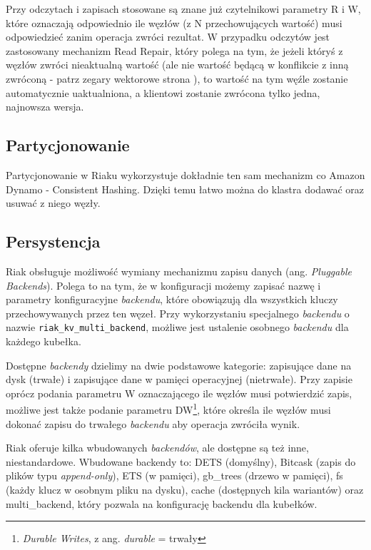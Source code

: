 Przy odczytach i zapisach stosowane są znane już czytelnikowi parametry R i W, które oznaczają odpowiednio ile węzłów (z N przechowujących wartość) musi odpowiedzieć zanim operacja zwróci rezultat.
W przypadku odczytów jest zastosowany mechanizm Read Repair, który polega na tym, że jeżeli któryś z węzłów zwróci nieaktualną wartość (ale nie wartość będącą w konflikcie z inną zwróconą - patrz zegary wektorowe strona \pageref{sec:dynamo-vector-clocks}), to wartość na tym węźle zostanie automatycznie uaktualniona, a klientowi zostanie zwrócona tylko jedna, najnowsza wersja. 

\subsection*{Partycjonowanie}

Partycjonowanie w Riaku wykorzystuje dokładnie ten sam mechanizm co Amazon Dynamo - Consistent Hashing.
Dzięki temu łatwo można do klastra dodawać oraz usuwać z niego węzły.

\subsection*{Persystencja}

Riak obsługuje możliwość wymiany mechanizmu zapisu danych (ang. \emph{Pluggable Backends}).
Polega to na tym, że w konfiguracji możemy zapisać nazwę i parametry konfiguracyjne \emph{backendu}, które obowiązują dla wszystkich kluczy przechowywanych przez ten węzeł.
Przy wykorzystaniu specjalnego \emph{backendu} o nazwie \verb+riak_kv_multi_backend+, możliwe jest ustalenie osobnego \emph{backendu} dla każdego kubełka.

Dostępne \emph{backendy} dzielimy na dwie podstawowe kategorie: zapisujące dane na dysk (trwałe) i zapisujące dane w pamięci operacyjnej (nietrwałe).
Przy zapisie oprócz podania parametru W oznaczającego ile węzłów musi potwierdzić zapis, możliwe jest także podanie parametru DW\footnote{\emph{Durable Writes}, z ang. \emph{durable} = trwały}, które określa ile węzłów musi dokonać zapisu do trwałego \emph{backendu} aby operacja zwróciła wynik.

Riak oferuje kilka wbudowanych \emph{backendów}, ale dostępne są też inne, niestandardowe.
Wbudowane backendy to: DETS (domyślny), Bitcask (zapis do plików typu \emph{append-only}), ETS (w pamięci), gb\_trees (drzewo w pamięci), fs (każdy klucz w osobnym pliku na dysku), cache (dostępnych kila wariantów) oraz multi\_backend, który pozwala na konfigurację backendu dla kubełków. 

